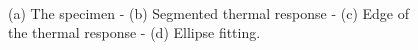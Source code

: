 \begin{figure}
  \centering
	

  \hspace*{\fill}
  \hspace*{\fill} \\ \hspace*{\fill}
   \hfill
   \hfill
  \hspace*{\fill}
	  
		\caption{(a) The specimen - (b) Segmented thermal response - (c) Edge of the thermal
		response - (d) Ellipse fitting.}
		\label{fig:9}
		\end{figure}
